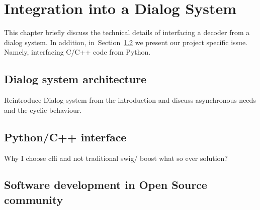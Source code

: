 \chapter{Integration into a Dialog System}
\label{cha:integration}
This chapter briefly discuss the technical details of interfacing
a decoder from a dialog system.
In addition, in~Section~\ref{sec:python_c_interface} we present our project specific issue.
Namely, interfacing C/C++ code from Python.

\section{Dialog system architecture} 
\label{sec:dialog_system_architecture}
Reintroduce Dialog system from the introduction and discuss asynchronous needs
and the cyclic behaviour.



\section{Python/C++ interface} 
\label{sec:python_c_interface}
Why I choose cffi and not traditional swig/ boost what so ever solution?


\section{Software development in Open Source community} 
\label{sec:software_development_in_open_source_community}



